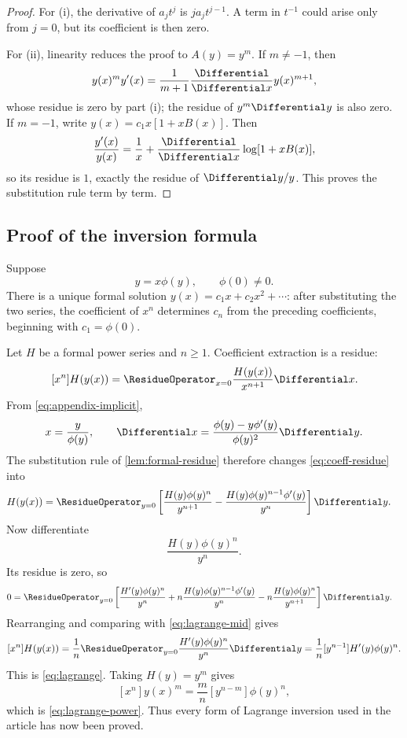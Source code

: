 \documentclass[11pt]{article}
\theoremstyle{remark}
\begin{document}
\begin{proof}
For (i), the derivative of \(a_jt^j\) is \(ja_jt^{j-1}\).  A term in
\(t^{-1}\) could arise only from \(j=0\), but its coefficient is then zero.

For (ii), linearity reduces the proof to \(A(y)=y^m\).  If \(m\neq-1\),
then
\[
       y(x)^m y'(x)
       =\frac1{m+1}\frac{\Differential}{\Differential x}y(x)^{m+1},
\]
whose residue is zero by part (i); the residue of \(y^m\Differential y\) is also zero.
If \(m=-1\), write \(y(x)=c_1x[1+xB(x)]\).  Then
\[
       \frac{y'(x)}{y(x)}
       =\frac1x+\frac{\Differential}{\Differential x}\log[1+xB(x)],
\]
so its residue is \(1\), exactly the residue of \(\Differential y/y\).  This proves
the substitution rule term by term.
\end{proof}

\subsection{Proof of the inversion formula}

Suppose
\begin{equation}\label{eq:appendix-implicit}
       y=x\phi(y),\qquad \phi(0)\neq0.
\end{equation}
There is a unique formal solution \(y(x)=c_1x+c_2x^2+\cdots\): after
substituting the two series, the coefficient of \(x^n\) determines \(c_n\)
from the preceding coefficients, beginning with \(c_1=\phi(0)\).

Let \(H\) be a formal power series and \(n\geq1\).  Coefficient extraction
is a residue:
\begin{equation}\label{eq:coeff-residue}
       [x^n]H(y(x))
       =\ResidueOperator_{x=0}\frac{H(y(x))}{x^{n+1}}\Differential x.
\end{equation}
From \eqref{eq:appendix-implicit},
\[
       x=\frac{y}{\phi(y)},
       \qquad
       \Differential x=\frac{\phi(y)-y\phi'(y)}{\phi(y)^2}\Differential y.
\]
The substitution rule of \cref{lem:formal-residue} therefore changes
\eqref{eq:coeff-residue} into
\begin{align}
 [x^n]H(y(x))
 &=\ResidueOperator_{y=0}
 \left[
 \frac{H(y)\phi(y)^n}{y^{n+1}}
 -\frac{H(y)\phi(y)^{n-1}\phi'(y)}{y^n}
 \right]\Differential y.
 \label{eq:lagrange-mid}
\end{align}
Now differentiate
\[
       \frac{H(y)\phi(y)^n}{y^n}.
\]
Its residue is zero, so
\begin{align*}
 0={}&\ResidueOperator_{y=0}\left[
 \frac{H'(y)\phi(y)^n}{y^n}
 +n\frac{H(y)\phi(y)^{n-1}\phi'(y)}{y^n}
 -n\frac{H(y)\phi(y)^n}{y^{n+1}}
 \right]\Differential y.
\end{align*}
Rearranging and comparing with \eqref{eq:lagrange-mid} gives
\[
 [x^n]H(y(x))
 =\frac1n\ResidueOperator_{y=0}
       \frac{H'(y)\phi(y)^n}{y^n}\Differential y
 =\frac1n[y^{n-1}]H'(y)\phi(y)^n.
\]
This is \eqref{eq:lagrange}.  Taking \(H(y)=y^m\) gives
\[
 [x^n]y(x)^m
 =\frac{m}{n}[y^{n-m}]\phi(y)^n,
\]
which is \eqref{eq:lagrange-power}.  Thus every form of Lagrange inversion
used in the article has now been proved.
\end{document}
